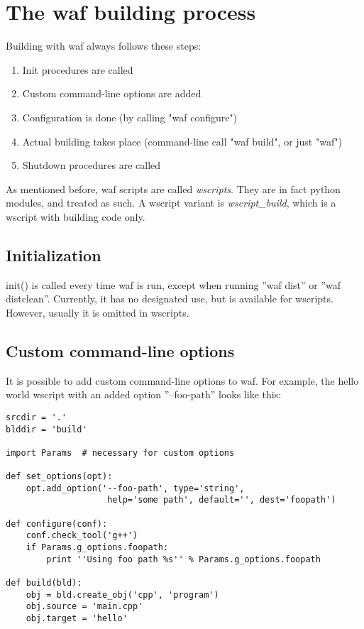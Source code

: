 \documentclass[a4,10pt]{article}
\begin{document}
\section{The waf building process}

Building with waf always follows these steps:

\begin{enumerate}
\item Init procedures are called
\item Custom command-line options are added
\item Configuration is done (by calling "waf configure")
\item Actual building takes place (command-line call "waf build", or just "waf")
\item Shutdown procedures are called
\end{enumerate}

As mentioned before, waf scripts are called \emph{wscripts}. They are in fact python modules, and treated as such. A wscript variant is \emph{wscript\_build}, which is a wscript with building code only.

\subsection{Initialization}
init() is called every time waf is run, except when running ''waf dist'' or ''waf distclean''. Currently, it has no designated use, but is
available for wscripts. However, usually it is omitted in wscripts.

\subsection{Custom command-line options}
It is possible to add custom command-line options to waf. For example, the hello world wscript with an added option ''--foo-path'' looks like this:

\begin{center}
	\begin{lstlisting}[caption=\footnotesize The hello world wscript with the custom option added]
srcdir = '.'
blddir = 'build'

import Params  # necessary for custom options

def set_options(opt):
	opt.add_option('--foo-path', type='string',
					help='some path', default='', dest='foopath')

def configure(conf):
    conf.check_tool('g++')
	if Params.g_options.foopath:
		print ''Using foo path %s'' % Params.g_options.foopath

def build(bld):
    obj = bld.create_obj('cpp', 'program')
    obj.source = 'main.cpp'
    obj.target = 'hello'
	\end{lstlisting}
\end{center}
\end{document}
